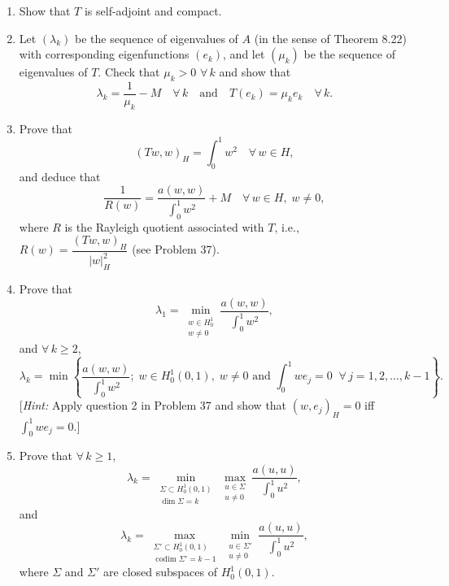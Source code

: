 \documentclass[12pt]{article}
\newcommand{\abs}[1]{\left|#1\right|}
\begin{document}
\begin{enumerate}
\item Show that $T$ is self-adjoint and compact.
 
 
\item Let $(\lambda_k)$ be the sequence of eigenvalues of $A$ (in the sense of Theorem 8.22)
with corresponding eigenfunctions $(e_k)$, and let $(\mu_k)$ be the sequence of
eigenvalues of $T$. Check that $\mu_k > 0$ $\forall\, k$ and show that
\[
\lambda_k = \frac{1}{\mu_k} - M \quad \forall\, k \quad \text{and} \quad T(e_k) = \mu_k e_k \quad \forall\, k.
\]
 
\item Prove that
\[
(Tw, w)_H = \int_0^1 w^2 \quad \forall\, w \in H,
\]
and deduce that
\[
\frac{1}{R(w)} = \frac{a(w,w)}{\displaystyle\int_0^1 w^2} + M \quad \forall\, w \in H,\; w \neq 0,
\]
where $R$ is the Rayleigh quotient associated with $T$, i.e.,
$R(w) = \dfrac{(Tw,w)_H}{\abs{w}_H^2}$ (see Problem 37).
 
\item Prove that
\begin{equation}\tag{1}
\lambda_1 = \min_{\substack{w \in H^1_0 \\ w \neq 0}} \frac{a(w,w)}{\displaystyle\int_0^1 w^2},
\end{equation}
and $\forall\, k \ge 2$,
\[
\lambda_k = \min\left\{\frac{a(w,w)}{\displaystyle\int_0^1 w^2};\; w \in H^1_0(0,1),\; w \neq 0
\text{ and } \int_0^1 we_j = 0\;\; \forall\, j = 1,2,\ldots,k-1\right\}.
\]
[\textit{Hint:} Apply question 2 in Problem 37 and show that $(w,e_j)_H = 0$ iff
$\int_0^1 we_j = 0$.]
 
\item Prove that $\forall\, k \ge 1$,
\[
\lambda_k = \min_{\substack{\Sigma \subset H^1_0(0,1) \\ \dim\Sigma = k}}
\max_{\substack{u \in \Sigma \\ u \neq 0}} \frac{a(u,u)}{\displaystyle\int_0^1 u^2},
\]
and
\[
\lambda_k = \max_{\substack{\Sigma' \subset H^1_0(0,1) \\ \operatorname{codim}\Sigma' = k-1}}
\min_{\substack{u \in \Sigma' \\ u \neq 0}} \frac{a(u,u)}{\displaystyle\int_0^1 u^2},
\]
where $\Sigma$ and $\Sigma'$ are closed subspaces of $H^1_0(0,1)$.
 
 

\end{enumerate}
\end{document}
